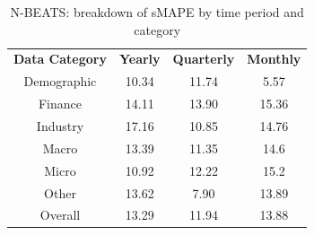 \documentclass{article}
\begin{document}
\begin{table}[!ht]
	\centering
	\begin{tabular}{cccc}
	 \toprule
		\textbf{Data Category} & \textbf{Yearly} & \textbf{Quarterly} & \textbf{Monthly} \\
		Demographic &  10.34 & 11.74 & 5.57 \\
		\midrule
		Finance & 14.11 & 13.90 & 15.36 \\
		\midrule
		Industry & 17.16 & 10.85 & 14.76 \\
		\midrule
		Macro & 13.39 & 11.35 & 14.6 \\
		\midrule
		Micro & 10.92 & 12.22 & 15.2 \\
		\midrule
		Other & 13.62 & 7.90 & 13.89 \\
		\midrule
		Overall & 13.29 & 11.94 & 13.88 \\		
		\bottomrule
	\end{tabular}
	\caption{N-BEATS: breakdown of sMAPE by time period and category}
\end{table}

\newpage
\end{document}
